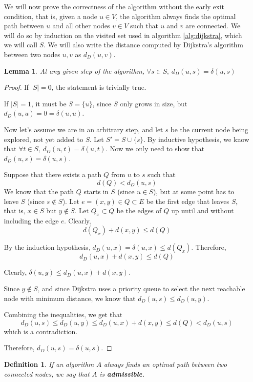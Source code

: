 \documentclass[12pt]{report}
\newtheorem{definition}[theorem]{Definition}
\newtheorem{lemma}[theorem]{Lemma}
\begin{document}
We will now prove the correctness of the algorithm without the early exit condition, that is, given a node $u \in V$, the algorithm always finds the optimal path between $u$ and all other nodes $v \in V$ such that $u$ and $v$ are connected. We will do so by induction on the visited set used in algorithm \ref{alg:dijkstra}, which we will call $S$. We will also write the distance computed by Dijkstra's algorithm between two nodes $u, v$ as $d_D(u, v)$.

\begin{lemma}
\label{lemma:dijkstra}
At any given step of the algorithm, $\forall s \in S,\ d_D(u, s) = \delta(u, s)$
\end{lemma}
\begin{proof}
If $|S| = 0$, the statement is trivially true.

If $|S| = 1$, it must be $S = \{u\}$, since $S$ only grows in size, but $d_D(u, u) = 0 = \delta(u, u)$.

Now let's assume we are in an arbitrary step, and let $s$ be the current node being explored, not yet added to $S$. Let $S' = S \cup \{s\}$. By inductive hypothesis, we know that $\forall t \in S,\ d_D(u, t) = \delta(u, t)$. Now we only need to show that $d_D(u, s) = \delta(u, s)$.

Suppose that there exists a path $Q$ from $u$ to $s$ such that
\[d(Q) < d_D(u, s)\]
We know that the path $Q$ starts in $S$ (since $u \in S$), but at some point has to leave $S$ (since $s \not\in S$). Let $e = (x, y) \in Q \subset E$ be the first edge that leaves $S$, that is, $x \in S$ but $y \not\in S$. Let $Q_x \subset Q$ be the edges of $Q$ up until and without including the edge $e$. Clearly,
\[d(Q_x) + d(x, y) \le d(Q)\]

By the induction hypothesis, $d_D(u, x) = \delta(u, x) \le d(Q_x)$. Therefore,
\[ d_D(u, x) + d(x, y) \le d(Q) \]

Clearly, $\delta(u, y) \le d_D(u, x) + d(x, y)$.

Since $y \not\in S$, and since Dijkstra uses a priority queue to select the next reachable node with minimum distance, we know that $d_D(u, s) \le d_D(u, y)$.

Combining the inequalities, we get that
\[ d_D(u, s) \le d_D(u, y) \le d_D(u, x) + d(x, y) \le d(Q) < d_D(u, s) \]
which is a contradiction.

Therefore, $d_D(u, s) = \delta(u, s)$.
\end{proof}

\begin{definition}
If an algorithm $A$ always finds an optimal path between two connected nodes, we say that $A$ is \textbf{admissible}.
\end{definition}
\end{document}
